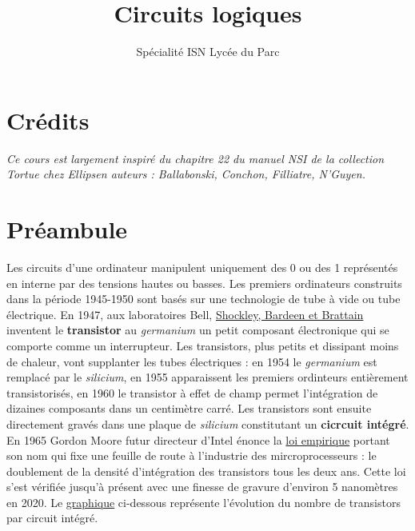 \documentclass[
  11pt,
]{article}
\title{Circuits logiques}
\author{Spécialité ISN Lycée du Parc}
\date{}
\newcounter{logi}
\begin{document}
\maketitle

\renewcommand*\contentsname{Table des matières}
{
\hypersetup{linkcolor=}
\setcounter{tocdepth}{3}
\tableofcontents
}
\hypertarget{cruxe9dits}{%
\section*{Crédits}\label{cruxe9dits}}

\emph{Ce cours est largement inspiré du chapitre 22 du manuel NSI de la
collection Tortue chez Ellipsen auteurs : Ballabonski, Conchon,
Filliatre, N'Guyen.}

\hypertarget{pruxe9ambule}{%
\section*{Préambule}\label{pruxe9ambule}}

Les circuits d'une ordinateur manipulent uniquement des 0 ou des 1
représentés en interne par des tensions hautes ou basses. Les premiers
ordinateurs construits dans la période 1945-1950 sont basés sur une
technologie de tube à vide ou tube électrique. En 1947, aux laboratoires
Bell, \href{https://fr.wikipedia.org/wiki/Transistor}{Shockley, Bardeen
et Brattain} inventent le \textbf{transistor} au \emph{germanium} un
petit composant électronique qui se comporte comme un interrupteur. Les
transistors, plus petits et dissipant moins de chaleur, vont supplanter
les tubes électriques : en 1954 le \emph{germanium} est remplacé par le
\emph{silicium}, en 1955 apparaissent les premiers ordinteurs
entièrement transistorisés, en 1960 le transistor à effet de champ
permet l'intégration de dizaines composants dans un centimètre carré.
Les transistors sont ensuite directement gravés dans une plaque de
\emph{silicium} constitutant un \textbf{cicrcuit intégré}. En 1965
Gordon Moore futur directeur d'Intel énonce la
\href{https://fr.wikipedia.org/wiki/Loi_de_Moore}{loi empirique} portant
son nom qui fixe une feuille de route à l'industrie des
mircroprocesseurs : le doublement de la densité d'intégration des
transistors tous les deux ans. Cette loi s'est vérifiée jusqu'à présent
avec une finesse de gravure d'environ 5 nanomètres en 2020. Le
\href{https://en.wikipedia.org/wiki/Moore\%27s_law\#/media/File:Moore's_Law_Transistor_Count_1971-2018.png}{graphique}
ci-dessous représente l'évolution du nombre de transistors par circuit
intégré.
\end{document}
